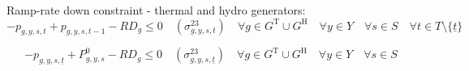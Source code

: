 \documentclass{article}
\newcommand{\sGeneratorsThermal}{G^{\mathrm{T}}}
\newcommand{\sGeneratorsHydro}{G^{\mathrm{H}}}
\newcommand{\sStorage}{G^{\mathrm{Q}}}
\newcommand{\sYears}{Y}
\newcommand{\sScenarios}{S}
\newcommand{\sIntervals}{T}
\newcommand{\iGenerator}{g}
\newcommand{\iYear}{y}
\newcommand{\iScenario}{s}
\newcommand{\iInterval}{t}
\newcommand{\iIntervalStart}{\underline{\iInterval}}
\newcommand{\cRampRateUp}[1][\iGenerator]{RU_{#1}}
\newcommand{\cRampRateDown}[1][\iGenerator]{RD_{#1}}
\newcommand{\cPowerInitial}[1][\iGenerator,\iYear,\iScenario]{P_{#1}^{0}}
\newcommand{\cPowerOutInitial}[1][\iGenerator,\iYear,\iScenario]{\hat{P}_{#1}^{\mathrm{out}}}
\newcommand{\cPowerInInitial}[1][\iGenerator,\iYear,\iScenario]{\hat{P}_{#1}^{\mathrm{in}}}
\newcommand{\vPower}[1][\iGenerator,\iYear,\iScenario,\iInterval]{p_{#1}}
\newcommand{\vPowerIn}[1][\iGenerator,\iYear,\iScenario,\iInterval]{p^{\mathrm{in}}_{#1}}
\newcommand{\vPowerOut}[1][\iGenerator,\iYear,\iScenario,\iInterval]{p^{\mathrm{out}}_{#1}}
\newcommand{\dRampRateUpStorageCharging}[1][\iGenerator,\iYear,\iScenario,\iInterval]{\sigma_{#1}^{21}}
\newcommand{\dRampRateUpStorageDischarging}[1][\iGenerator,\iYear,\iScenario,\iInterval]{\sigma_{#1}^{22}}
\newcommand{\dRampRateDown}[1][\iGenerator,\iYear,\iScenario,\iInterval]{\sigma_{#1}^{23}}
\begin{document}
%
%
%
%
%
%
%
Ramp-rate down constraint - thermal and hydro generators:
\begin{equation}
	- \vPower + \vPower[\iGenerator,\iYear,\iScenario,\iInterval-1] - \cRampRateDown \leq 0 \quad (\dRampRateDown) \quad \forall \iGenerator \in \sGeneratorsThermal \cup \sGeneratorsHydro \quad \forall \iYear \in \sYears \quad \forall \iScenario \in \sScenarios \quad \forall \iInterval \in \sIntervals \setminus \{\iIntervalStart\}
\end{equation}

\begin{equation}
- \vPower[\iGenerator,\iYear,\iScenario,\iIntervalStart] + \cPowerInitial - \cRampRateDown \leq 0 \quad (\dRampRateDown[\iGenerator,\iYear,\iScenario,\iIntervalStart]) \quad \forall \iGenerator \in \sGeneratorsThermal \cup \sGeneratorsHydro \quad \forall \iYear \in \sYears \quad \forall \iScenario \in \sScenarios
\end{equation}
\end{document}
